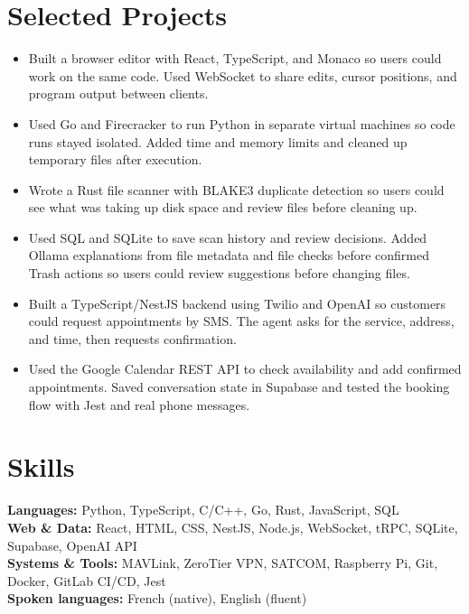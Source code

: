 \section{Selected Projects}
\begin{itemize}
  \item Built a browser editor with React, TypeScript, and Monaco so users could work on the same code. Used WebSocket to share edits, cursor positions, and program output between clients.
  \item Used Go and Firecracker to run Python in separate virtual machines so code runs stayed isolated. Added time and memory limits and cleaned up temporary files after execution.
\end{itemize}
\begin{itemize}
  \item Wrote a Rust file scanner with BLAKE3 duplicate detection so users could see what was taking up disk space and review files before cleaning up.
  \item Used SQL and SQLite to save scan history and review decisions. Added Ollama explanations from file metadata and file checks before confirmed Trash actions so users could review suggestions before changing files.
\end{itemize}
\begin{itemize}
  \item Built a TypeScript/NestJS backend using Twilio and OpenAI so customers could request appointments by SMS. The agent asks for the service, address, and time, then requests confirmation.
  \item Used the Google Calendar REST API to check availability and add confirmed appointments. Saved conversation state in Supabase and tested the booking flow with Jest and real phone messages.
\end{itemize}

\section{Skills}
\textbf{Languages:} Python, TypeScript, C/C++, Go, Rust, JavaScript, SQL\\
\textbf{Web \& Data:} React, HTML, CSS, NestJS, Node.js, WebSocket, tRPC, SQLite, Supabase, OpenAI API\\
\textbf{Systems \& Tools:} MAVLink, ZeroTier VPN, SATCOM, Raspberry Pi, Git, Docker, GitLab CI/CD, Jest\\
\textbf{Spoken languages:} French (native), English (fluent)


